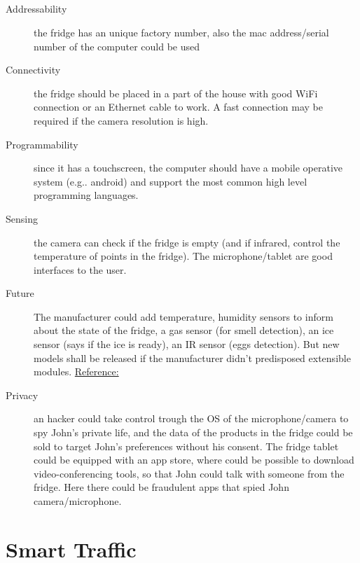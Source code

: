 \documentclass[a4paper, 12pt]{article}
\begin{document}
\subsection{} %
\label{sub:}
\begin{description}
    \item[Addressability] the fridge has an unique factory number, also the mac
		address/serial number of the computer could be used
	\item[Connectivity] the fridge should be placed in a part of the house with
		good WiFi connection or an Ethernet cable to work. A fast connection may
		be required if the camera resolution is high. 
	\item[Programmability] since it has a touchscreen, the computer should have
		a mobile operative system (e.g.. android) and support the most common
		high level programming languages.
	\item[Sensing] the camera can check if the fridge is empty (and if infrared,
		control the temperature of points in the fridge). The microphone/tablet
		are good interfaces to the user.
	\item[Future]
		The manufacturer
		could add temperature, humidity sensors to inform about the state of
		the fridge,
a gas sensor (for smell detection), an ice sensor (says if the
		ice is ready), an IR sensor (eggs detection). But new models shall be
		released if the manufacturer didn't predisposed extensible modules.
		\href{https://www.ijariit.com/manuscripts/v3i1/V3I1-1375.pdf}{Reference:}
	\item[Privacy] an hacker could take control trough the OS of the microphone/camera
		to spy John's private life, and
		the data of the products in the fridge could be sold to target John's
		preferences without his consent. The fridge tablet could be equipped with an app store,
		where could be possible to download video-conferencing tools, so that
		John could talk with someone from the fridge. Here there could be
		fraudulent apps that spied John camera/microphone.
\end{description}



\section{Smart Traffic} %
\label{sec:smart_traffic}
\end{document}

